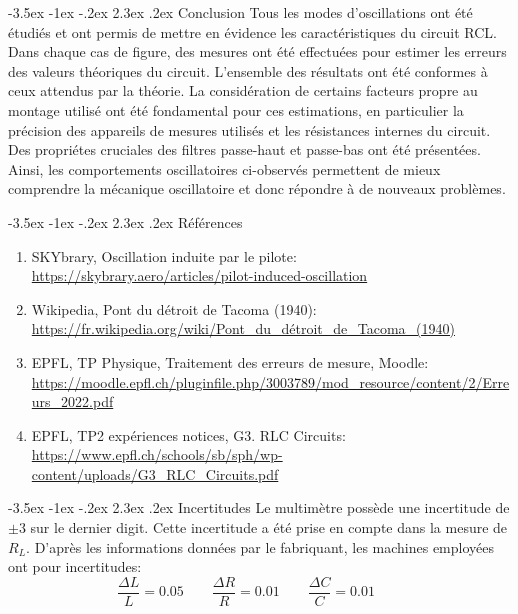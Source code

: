 \documentclass[a4paper, 12pt,oneside]{article}
\makeatletter
\renewcommand{\section}{\@startsection {section}{1}{\z@}%
             {-3.5ex \@plus -1ex \@minus -.2ex}%
             {2.3ex \@plus.2ex}%
             {\normalfont\normalsize\bfseries}}
\makeatother
\begin{document}
\section{Conclusion}
Tous les modes d'oscillations ont été étudiés et ont permis de mettre en évidence les caractéristiques du circuit RCL. Dans chaque cas de figure, des mesures ont été effectuées pour estimer les erreurs des valeurs théoriques du circuit. L'ensemble des résultats ont été conformes à ceux attendus par la théorie. La considération de certains facteurs propre au montage utilisé ont été fondamental pour ces estimations, en particulier la précision des appareils de mesures utilisés et les résistances internes du circuit. Des propriétes cruciales des filtres passe-haut et passe-bas ont été présentées. Ainsi, les comportements oscillatoires ci-observés permettent de mieux comprendre la mécanique oscillatoire et donc répondre à de nouveaux problèmes.

\section{Références}
\renewcommand{\labelenumi}{[\theenumi]}
\begin{enumerate}
    \item \label{ref1} SKYbrary, Oscillation induite par le pilote:\\\url{https://skybrary.aero/articles/pilot-induced-oscillation}
    \item \label{Tacoma} Wikipedia, Pont du détroit de Tacoma (1940): \\\url{https://fr.wikipedia.org/wiki/Pont_du_détroit_de_Tacoma_(1940)}
    \item \label{ref9} EPFL, TP Physique, Traitement des erreurs de mesure, Moodle:\\ \url{https://moodle.epfl.ch/pluginfile.php/3003789/mod_resource/content/2/Erreurs_2022.pdf}
    \item \label{ref0} EPFL, TP2 expériences notices, G3. RLC Circuits: \\\url{https://www.epfl.ch/schools/sb/sph/wp-content/uploads/G3_RLC_Circuits.pdf}
\end{enumerate}

\section{Incertitudes}
Le multimètre possède une incertitude de $\pm 3$ sur le dernier digit. Cette incertitude a été prise en compte dans la mesure de $R_L$.
D'après les informations données par le fabriquant, les machines employées ont pour incertitudes:
\[
    \frac{\Delta L}{L} = 0.05 \qquad
    \frac{\Delta R}{R} = 0.01 \qquad
    \frac{\Delta C}{C} = 0.01 \qquad
\]
\end{document}
